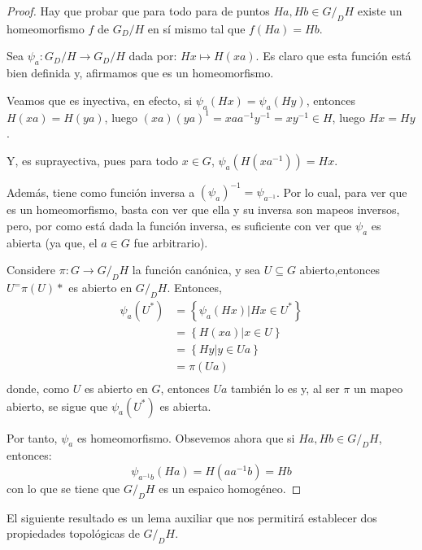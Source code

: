 \documentclass[12pt]{report}
\theoremstyle{largebreak}
\newcommand{\cf}[3]{\ensuremath{#1:#2\rightarrow#3}}
\begin{document}
    \begin{proof}
        Hay que probar que para todo para de puntos $Ha,Hb\in G/_DH$ existe un homeomorfismo $f$ de $G_D/H$ en sí mismo tal que $f(Ha)=Hb$.
        
        Sea $\cf{\psi_a}{G_D/H}{G_D/H}$ dada por: $Hx\mapsto H(xa)$. Es claro que esta función está bien definida y, afirmamos que es un homeomorfismo. 
        
        Veamos que es inyectiva, en efecto, si $\psi_a(Hx)=\psi_a(Hy)$, entonces $H(xa)=H(ya)$, luego $(xa)(ya)^1=xaa^{-1}y^{-1}=xy^{-1}\in H$, luego $Hx=Hy$.

        Y, es suprayectiva, pues para todo $x\in G$, $\psi_a(H(xa^{-1}))=Hx$.

        Además, tiene como función inversa a $(\psi_a)^{-1}=\psi_{a^{-1}}$. Por lo cual, para ver que es un homeomorfismo, basta con ver que ella y su inversa son mapeos inversos, pero, por como está dada la función inversa, es suficiente con ver que $\psi_a$ es abierta (ya que, el $a\in G$ fue arbitrario).

        Considere $\cf{\pi}{G}{G/_DH}$ la función canónica, y sea $U\subseteq G$ abierto,entonces $U^=\pi(U)*$ es abierto en $G/_DH$. Entonces, 
        \begin{equation*}
            \begin{split}
                \psi_a(U^*)&=\left\{\psi_a(Hx)\Big| Hx\in U^* \right\}\\
                &=\left\{H(xa) \Big| x\in U \right\}\\
                &=\left\{Hy \Big| y\in Ua \right\}\\
                &=\pi(Ua)\\
            \end{split}
        \end{equation*}
        donde, como $U$ es abierto en $G$, entonces $Ua$ también lo es y, al ser $\pi$ un mapeo abierto, se sigue que $\psi_a(U^*)$ es abierta. 

        Por tanto, $\psi_a$ es homeomorfismo. Obsevemos ahora que si $Ha,Hb\in G/_DH$, entonces:
        \begin{equation*}
            \psi_{a^{-1}b}(Ha)=H(aa^{-1}b)=Hb
        \end{equation*}
        con lo que se tiene que $G/_DH$ es un espaico homogéneo.
    \end{proof}

    El siguiente resultado es un lema auxiliar que nos permitirá establecer dos propiedades topológicas de $G/_DH$.
\end{document}

